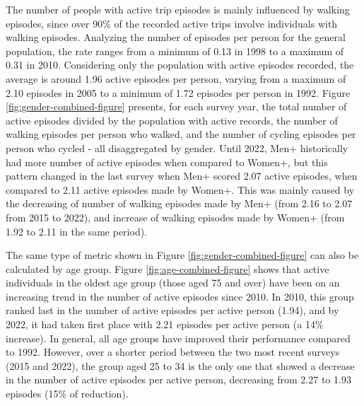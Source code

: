 \documentclass[preprint, 3p,
authoryear]{elsarticle} %
\begin{document}
The number of people with active trip episodes is mainly influenced by
walking episodes, since over 90\% of the recorded active trips involve
individuals with walking episodes. Analyzing the number of episodes per
person for the general population, the rate ranges from a minimum of
0.13 in 1998 to a maximum of 0.31 in 2010. Considering only the
population with active episodes recorded, the average is around 1.96
active episodes per person, varying from a maximum of 2.10 episodes in
2005 to a minimum of 1.72 episodes per person in 1992. Figure
\ref{fig:gender-combined-figure} presents, for each survey year, the
total number of active episodes divided by the population with active
records, the number of walking episodes per person who walked, and the
number of cycling episodes per person who cycled - all disaggregated by
gender. Until 2022, Men+ historically had more number of active episodes
when compared to Women+, but this pattern changed in the last survey
when Men+ scored 2.07 active episodes, when compared to 2.11 active
episodes made by Women+. This was mainly caused by the decreasing of
number of walking episodes made by Men+ (from 2.16 to 2.07 from 2015 to
2022), and increase of walking episodes made by Women+ (from 1.92 to
2.11 in the same period).

The same type of metric shown in Figure \ref{fig:gender-combined-figure}
can also be calculated by age group. Figure
\ref{fig:age-combined-figure} shows that active individuals in the
oldest age group (those aged 75 and over) have been on an increasing
trend in the number of active episodes since 2010. In 2010, this group
ranked last in the number of active episodes per active person (1.94),
and by 2022, it had taken first place with 2.21 episodes per active
person (a 14\% increase). In general, all age groups have improved their
performance compared to 1992. However, over a shorter period between the
two most recent surveys (2015 and 2022), the group aged 25 to 34 is the
only one that showed a decrease in the number of active episodes per
active person, decreasing from 2.27 to 1.93 episodes (15\% of
reduction).
\end{document}
